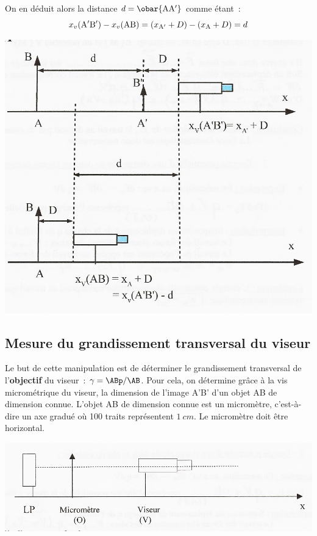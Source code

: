 \documentclass[../main/main.tex]{subfiles}
\begin{document}
{\begin{minipage}[c]{.48\linewidth}
\begin{tcb}
			On en déduit alors la distance $d = \obar{\rm AA'}$ comme étant~:
			\[
				x_{v}({\rm A'B'}) - x_{v}({\rm AB}) =
				(x_{\rm A'}+D) - (x_{\rm A}+D) = d
			\]
		\end{tcb}
	\end{minipage}
	\hfill
	\begin{minipage}[c]{.48\linewidth}
		\begin{center}
			\includegraphics[width=\linewidth]{principe1}
		\end{center}
	\end{minipage}

	\subsection{Mesure du grandissement transversal du viseur}


	Le but de cette manipulation est de déterminer le grandissement
	transversal de l'\textbf{objectif} du viseur~: $\gamma = \ABp/\AB$. Pour
	cela, on détermine grâce à la vis micrométrique du viseur, la dimension de
	l'image A'B' d'un objet AB de dimension connue. L'objet AB de dimension connue
	est un micromètre, c'est-à-dire un axe gradué où 100 traits
	représentent $\SI{1}{cm}$. Le micromètre doit être horizontal.
	\begin{center}
		\includegraphics[width=\textwidth]{PointeTransversal}
	\end{center}

}
\end{document}
